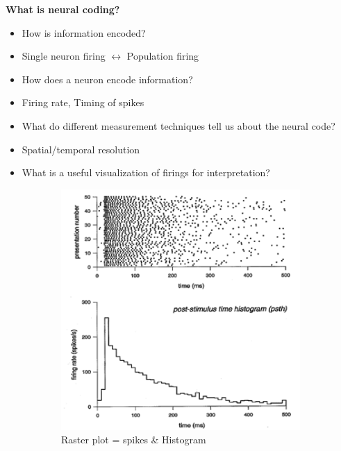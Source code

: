 \documentclass[english,11pt]{article}
\begin{document}
\textbf{What is neural coding?}
\begin{itemize}
\item How is information encoded?
\item Single neuron firing $\leftrightarrow$  Population firing
\item How does a neuron encode information?
\item Firing rate, Timing of spikes
\item What do different measurement techniques tell us about the neural code?
\item Spatial/temporal resolution
\item What is a useful visualization of firings for interpretation?
\end{itemize}
\begin{figure}[H]
        \centering
        \begin{subfigure}[b]{0.5\textwidth}
                \centering
				\includegraphics[width=\textwidth]{neural-coding-problem.png}
				\caption{Raster plot = spikes \& Histogram}
        \end{subfigure}%
        ~
        \begin{subfigure}[b]{0.5\textwidth}
                \centering

\end{subfigure}
\end{figure}
\end{document}
